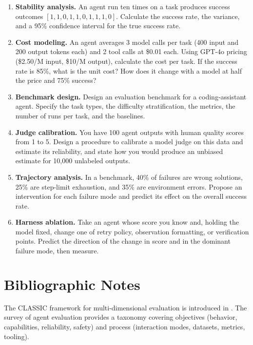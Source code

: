 \documentclass[11pt]{book}
\begin{document}
\begin{enumerate}
\item \textbf{Stability analysis.} An agent run ten times on a task produces success outcomes $[1, 1, 0, 1, 1, 0, 1, 1, 1, 0]$. Calculate the success rate, the variance, and a 95\% confidence interval for the true success rate.

\item \textbf{Cost modeling.} An agent averages 3 model calls per task (400 input and 200 output tokens each) and 2 tool calls at \$0.01 each. Using GPT-4o pricing (\$2.50/M input, \$10/M output), calculate the cost per task. If the success rate is 85\%, what is the unit cost? How does it change with a model at half the price and 75\% success?

\item \textbf{Benchmark design.} Design an evaluation benchmark for a coding-assistant agent. Specify the task types, the difficulty stratification, the metrics, the number of runs per task, and the baselines.

\item \textbf{Judge calibration.} You have 100 agent outputs with human quality scores from 1 to 5. Design a procedure to calibrate a model judge on this data and estimate its reliability, and state how you would produce an unbiased estimate for 10{,}000 unlabeled outputs.

\item \textbf{Trajectory analysis.} In a benchmark, 40\% of failures are wrong solutions, 25\% are step-limit exhaustion, and 35\% are environment errors. Propose an intervention for each failure mode and predict its effect on the overall success rate.

\item \textbf{Harness ablation.} Take an agent whose score you know and, holding the model fixed, change one of retry policy, observation formatting, or verification points. Predict the direction of the change in score and in the dominant failure mode, then measure.
\end{enumerate}

\section*{Bibliographic Notes}

The CLASSIC framework for multi-dimensional evaluation is introduced in \cite{classic2025}. The survey of agent evaluation \cite{agentevalsurvey2025} provides a taxonomy covering objectives (behavior, capabilities, reliability, safety) and process (interaction modes, datasets, metrics, tooling).
\end{document}
